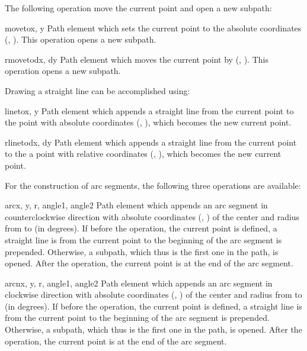 The following operation move the current point and open a new subpath:

\begin{classdesc}{moveto}{x, y}
Path element which sets the current point to the absolute coordinates (,
). This operation opens a new subpath. 
\end{classdesc}

\begin{classdesc}{rmoveto}{dx, dy}
Path element which moves the current point by (, ). 
This operation opens a new subpath. 
\end{classdesc}

Drawing a straight line can be accomplished using:

\begin{classdesc}{lineto}{x, y}
Path element which appends a straight line from the current point to the
point with absolute coordinates (, ), which becomes
the new current point. 
\end{classdesc}

\begin{classdesc}{rlineto}{dx, dy}
Path element which appends a straight line from the current point to the
a point with relative coordinates (, ), which becomes
the new current point. 
\end{classdesc}

For the construction of arc segments, the following three operations
are available:

\begin{classdesc}{arc}{x, y, r, angle1, angle2}
Path element which appends an arc segment in counterclockwise direction
with absolute coordinates (, ) of the center and 
radius  from  to  (in degrees). 
If before the operation, the current point is defined, a straight line
is from the current point to the beginning of the arc segment is
prepended. Otherwise, a subpath, which thus is the first one in the
path, is opened. After the operation, the current point is at the end
of the arc segment. 
\end{classdesc}

\begin{classdesc}{arcn}{x, y, r, angle1, angle2}
Path element which appends an arc segment in clockwise direction
with absolute coordinates (, ) of the center and 
radius  from  to  (in degrees). 
If before the operation, the current point is defined, a straight line
is from the current point to the beginning of the arc segment is
prepended. Otherwise, a subpath, which thus is the first one in the
path, is opened. After the operation, the current point is at the end
of the arc segment. 
\end{classdesc}


